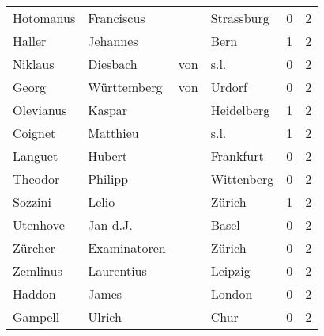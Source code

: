 \begin{center}
\begin{tiny}
\begin{longtabu}{llllrr}
                Hotomanus &                         Franciscus &             &                                  Strassburg &          0 &         2 \\
                   Haller &                           Jehannes &             &                                        Bern &          1 &         2 \\
                  Niklaus &                           Diesbach &         von &                                        s.l. &          0 &         2 \\
                    Georg &                        Württemberg &         von &                                      Urdorf &          0 &         2 \\
                Olevianus &                             Kaspar &             &                                  Heidelberg &          1 &         2 \\
                  Coignet &                           Matthieu &             &                                        s.l. &          1 &         2 \\
                  Languet &                             Hubert &             &                                   Frankfurt &          0 &         2 \\
                  Theodor &                            Philipp &             &                                  Wittenberg &          0 &         2 \\
                  Sozzini &                              Lelio &             &                                      Zürich &          1 &         2 \\
                 Utenhove &                           Jan d.J. &             &                                       Basel &          0 &         2 \\
                  Zürcher &                       Examinatoren &             &                                      Zürich &          0 &         2 \\
                 Zemlinus &                         Laurentius &             &                                     Leipzig &          0 &         2 \\
                   Haddon &                              James &             &                                      London &          0 &         2 \\
                  Gampell &                             Ulrich &             &                                        Chur &          0 &         2 \\

\end{longtabu}
\end{tiny}
\end{center}
